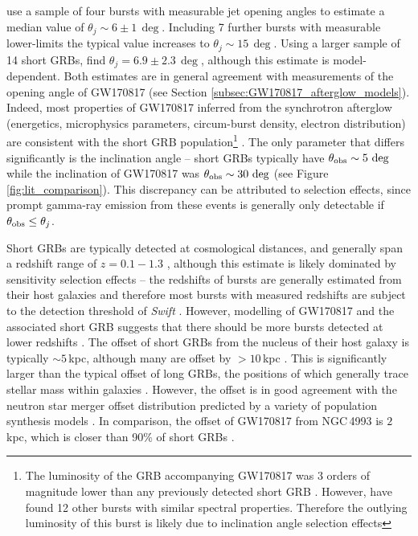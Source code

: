 \citet{2015ApJ...815..102F} use a sample of four bursts with measurable jet opening angles to estimate a median value of $\theta_j\sim 6\pm 1\,\deg$. Including 7 further bursts with measurable lower-limits the typical value increases to $\theta_j\sim 15\,\deg$. Using a larger sample of 14 short GRBs,  \citet{2019ApJ...880L..23W} find $\theta_j=6.9\pm 2.3\,\deg$, although this estimate is model-dependent. Both estimates are in general agreement with measurements of the opening angle of GW170817 (see Section \ref{subsec:GW170817_afterglow_models}). Indeed, most properties of GW170817 inferred from the synchrotron afterglow (energetics, microphysics parameters, circum-burst density, electron distribution) are consistent with the short GRB population\footnote{The luminosity of the GRB accompanying GW170817 was 3 orders of magnitude lower than any previously detected short GRB \citep{2017ApJ...848L..13A}. However, \citet{2019ApJ...876...89V} have found 12 other bursts with similar spectral properties. Therefore the outlying luminosity of this burst is likely due to inclination angle selection effects} \citep{2019ApJ...880L..23W}. The only parameter that differs significantly is the inclination angle -- short GRBs typically have $\theta_{\rm obs}\sim 5\,\deg$ while the inclination of GW170817 was $\theta_{\rm obs}\sim 30\,\deg$ (see Figure \ref{fig:lit_comparison}). This discrepancy can be attributed to selection effects, since prompt gamma-ray emission from these events is generally only detectable if $\theta_{\rm obs}\leq \theta_j$.

Short GRBs are typically detected at cosmological distances, and generally span a redshift range of $z=0.1-1.3$ \citep{2013ApJ...776...18F}, although this estimate is likely dominated by sensitivity selection effects -- the redshifts of bursts are generally estimated from their host galaxies and therefore most bursts with measured redshifts are subject to the detection threshold of \textit{Swift} \citep{2014ARA&A..52...43B}. However, modelling of GW170817 and the associated short GRB suggests that there should be more bursts detected at lower redshifts \citep{2019MNRAS.485.1435H}. The offset of short GRBs from the nucleus of their host galaxy is typically $\sim 5\,$kpc, although many are offset by $>10\,$kpc \citep{2015ApJ...815..102F}. This is significantly larger than the typical offset of long GRBs, the positions of which generally trace stellar mass within galaxies \citep{2002AJ....123.1111B}. However, the offset is in good agreement with the neutron star merger offset distribution predicted by a variety of population synthesis models \citep{2013ApJ...776...18F}. In comparison, the offset of GW170817 from NGC\,4993 is $2\,$kpc, which is closer than 90\% of short GRBs \citep{2017ApJ...848L..28L}.


